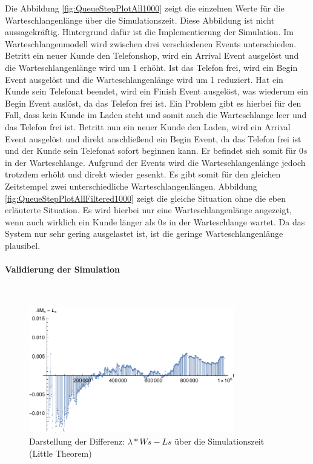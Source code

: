 Die Abbildung \ref{fig:QueueStepPlotAll1000} zeigt die einzelnen Werte für die Warteschlangenlänge über die Simulationszeit. Diese Abbildung ist nicht aussagekräftig. Hintergrund dafür ist die Implementierung der Simulation. Im Warteschlangenmodell wird zwischen drei verschiedenen Events unterschieden. Betritt ein neuer Kunde den Telefonshop, wird ein Arrival Event ausgelöst und die Warteschlangenlänge wird um 1 erhöht. Ist das Telefon frei, wird ein Begin Event ausgelöst und die Warteschlangenlänge wird um 1 reduziert. Hat ein Kunde sein Telefonat beendet, wird ein Finish Event ausgelöst, was wiederum ein Begin Event auslöst, da das Telefon frei ist. Ein Problem gibt es hierbei für den Fall, dass kein Kunde im Laden steht und somit auch die Warteschlange leer und das Telefon frei ist. Betritt nun ein neuer Kunde den Laden, wird ein Arrival Event ausgelöst und direkt anschließend ein Begin Event, da das Telefon frei ist und der Kunde sein Telefonat sofort beginnen kann. Er befindet sich somit für $0s$ in der Warteschlange. Aufgrund der Events wird die Warteschlangenlänge jedoch trotzdem erhöht und direkt wieder gesenkt. Es gibt somit für den gleichen Zeitstempel zwei unterschiedliche Warteschlangenlängen. Abbildung \ref{fig:QueueStepPlotAllFiltered1000} zeigt die gleiche Situation ohne die eben erläuterte Situation. Es wird hierbei nur eine Warteschlangenlänge angezeigt, wenn auch wirklich ein Kunde länger als $0s$ in der Warteschlange wartet. Da das System nur sehr gering ausgelastet ist, ist die geringe Warteschlangenlänge plausibel.\\

\paragraph{Validierung der Simulation}
\\
\begin{figure}[htpb]
	\centering
	\includegraphics[width=0.8\textwidth]{abbildungen/1_Phone/Arrival_1000_Serve_100_dur_1000000_Skip_0/LittleSystem.pdf}
	\caption{Darstellung der Differenz: $\lambda * Ws - Ls$ über die Simulationszeit (Little Theorem)}
	\label{fig:LittleSystem1000}
\end{figure}

